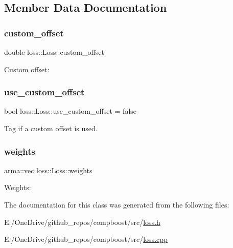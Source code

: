 \subsection{Member Data Documentation}
\mbox{\label{classloss_1_1_loss_ae5dc373f54ed65ee0ca54a921ef826f4}} 
\subsubsection{\texorpdfstring{custom\+\_\+offset}{custom\_offset}}
{\footnotesize\ttfamily double loss\+::\+Loss\+::custom\+\_\+offset\hspace{0.3cm}{\ttfamily [protected]}}



Custom offset\+: 

\mbox{\label{classloss_1_1_loss_a5fabbbb104e6f430498630130ac8a131}} 
\subsubsection{\texorpdfstring{use\+\_\+custom\+\_\+offset}{use\_custom\_offset}}
{\footnotesize\ttfamily bool loss\+::\+Loss\+::use\+\_\+custom\+\_\+offset = false\hspace{0.3cm}{\ttfamily [protected]}}



Tag if a custom offset is used. 

\mbox{\label{classloss_1_1_loss_a4cfecaa4e3a6244ec82651607340e751}} 
\subsubsection{\texorpdfstring{weights}{weights}}
{\footnotesize\ttfamily arma\+::vec loss\+::\+Loss\+::weights\hspace{0.3cm}{\ttfamily [protected]}}



Weights\+: 



The documentation for this class was generated from the following files\+:\begin{DoxyCompactItemize}
\item 
E\+:/\+One\+Drive/github\+\_\+repos/compboost/src/\mbox{\hyperlink{loss_8h}{loss.\+h}}\item 
E\+:/\+One\+Drive/github\+\_\+repos/compboost/src/\mbox{\hyperlink{loss_8cpp}{loss.\+cpp}}\end{DoxyCompactItemize}
